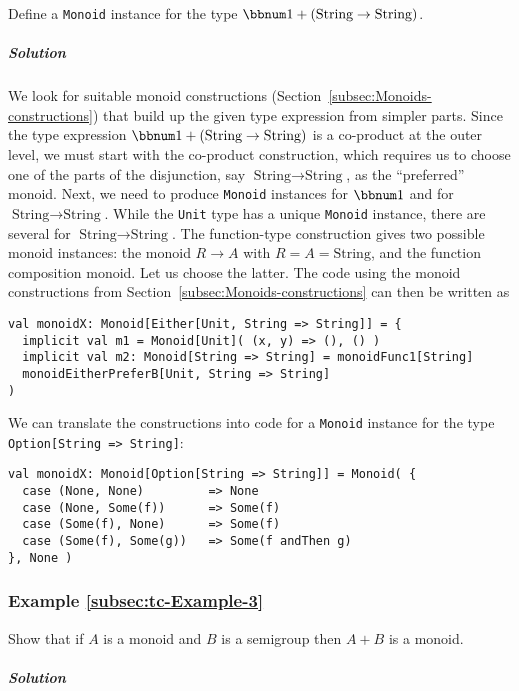 Define a \lstinline!Monoid! instance for the type $\bbnum 1+(\text{String}\rightarrow\text{String})$.

\subparagraph{Solution}

We look for suitable monoid constructions (Section~\ref{subsec:Monoids-constructions})
that build up the given type expression from simpler parts. Since
the type expression $\bbnum 1+(\text{String}\rightarrow\text{String})$
is a co-product at the outer level, we must start with the co-product
construction, which requires us to choose one of the parts of the
disjunction, say $\text{String}\rightarrow\text{String}$, as the
\textsf{``}preferred\textsf{''} monoid. Next, we need to produce \lstinline!Monoid!
instances for $\bbnum 1$ and for $\text{String}\rightarrow\text{String}$.
While the \lstinline!Unit! type has a unique \lstinline!Monoid!
instance, there are several for $\text{String}\rightarrow\text{String}$.
The function-type construction gives two possible monoid instances:
the monoid $R\rightarrow A$ with $R=A=\text{String}$, and the function
composition monoid. Let us choose the latter. The code using the monoid
constructions from Section~\ref{subsec:Monoids-constructions} can
then be written as
\begin{lstlisting}
val monoidX: Monoid[Either[Unit, String => String]] = {
  implicit val m1 = Monoid[Unit]( (x, y) => (), () )
  implicit val m2: Monoid[String => String] = monoidFunc1[String]
  monoidEitherPreferB[Unit, String => String]
)
\end{lstlisting}
We can translate the constructions into code for a \lstinline!Monoid!
instance for the type \lstinline!Option[String => String]!:
\begin{lstlisting}
val monoidX: Monoid[Option[String => String]] = Monoid( {
  case (None, None)         => None
  case (None, Some(f))      => Some(f)
  case (Some(f), None)      => Some(f)
  case (Some(f), Some(g))   => Some(f andThen g)
}, None )
\end{lstlisting}


\subsubsection{Example \label{subsec:tc-Example-3}\ref{subsec:tc-Example-3}}

Show that if $A$ is a monoid and $B$ is a semigroup then $A+B$
is a monoid.

\subparagraph{Solution}

